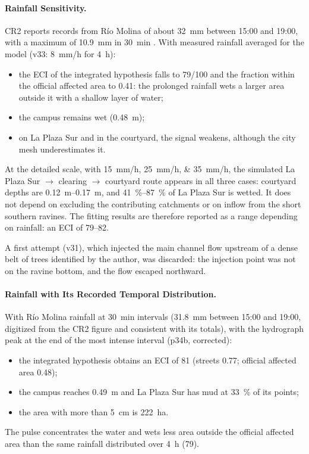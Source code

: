 \paragraph{Rainfall Sensitivity.} CR2 reports records from Río Molina of about \SI{32}{mm} between 15:00 and 19:00, with a maximum of \SI{10.9}{mm} in \SI{30}{min} \citep{cr2_2026}. With measured rainfall averaged for the model (v33: \SI{8}{mm/h} for \SI{4}{h}):
\begin{itemize}
\item the ECI of the integrated hypothesis falls to 79/100 and the fraction within the official affected area to 0.41: the prolonged rainfall wets a larger area outside it with a shallow layer of water;
\item the campus remains wet (\SI{0.48}{m});
\item on La Plaza Sur and in the courtyard, the signal weakens, although the city mesh underestimates it.
\end{itemize}
At the detailed scale, with \SIlist{15;25;35}{mm/h}, the simulated La Plaza Sur $\rightarrow$ clearing $\rightarrow$ courtyard route appears in all three cases: courtyard depths are \SIrange{0.12}{0.17}{m}, and \SIrange{41}{87}{\percent} of La Plaza Sur is wetted. It does not depend on excluding the contributing catchments or on inflow from the short southern ravines. The fitting results are therefore reported as a range depending on rainfall: an ECI of 79--82.

A first attempt (v31), which injected the main channel flow upstream of a dense belt of trees identified by the author, was discarded: the injection point was not on the ravine bottom, and the flow escaped northward.

\paragraph{Rainfall with Its Recorded Temporal Distribution.} With Río Molina rainfall at \SI{30}{min} intervals (\SI{31.8}{mm} between 15:00 and 19:00, digitized from the CR2 figure and consistent with its totals), with the hydrograph peak at the end of the most intense interval (p34b, corrected):
\begin{itemize}
\item the integrated hypothesis obtains an ECI of 81 (streets 0.77; official affected area 0.48);
\item the campus reaches \SI{0.49}{m} and La Plaza Sur has mud at \SI{33}{\percent} of its points;
\item the area with more than \SI{5}{cm} is \SI{222}{ha}.
\end{itemize}
The pulse concentrates the water and wets less area outside the official affected area than the same rainfall distributed over \SI{4}{h} (79).

